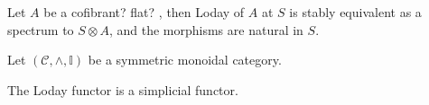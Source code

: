     \begin{cor}\label{cor_loday_at_S_naturally_equivalent_to_tensor_with_S}
      Let $A$ be a cofibrant? flat? \hring, then Loday of $A$ at $S$ is stably equivalent as a spectrum to $S \otimes A$, and the morphisms are natural in $S$.
    \end{cor}
    \begin{defn}\label{def_loday_functor_in_symmetric_monoidal_category} 
      Let $(\mathcal{C},\wedge, \mathbb{I})$ be a symmetric monoidal category.\\
    \end{defn}
    \begin{lem}\label{lem_loday_functor_is_simplicial}
      The Loday functor is a simplicial functor.\\
    \end{lem}
